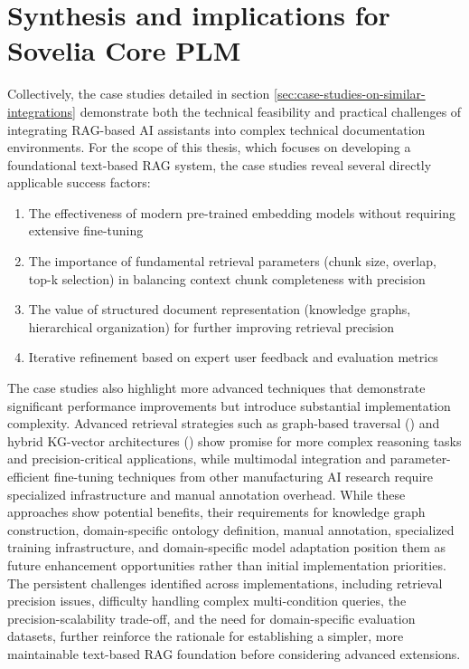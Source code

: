 \section{Synthesis and implications for Sovelia Core PLM}

Collectively, the case studies detailed in section \ref{sec:case-studies-on-similar-integrations} demonstrate both the technical feasibility and practical challenges of integrating RAG-based AI assistants into complex technical documentation environments. For the scope of this thesis, which focuses on developing a foundational text-based RAG system, the case studies reveal several directly applicable success factors:

\begin{enumerate}
    \item The effectiveness of modern pre-trained embedding models without requiring extensive fine-tuning
    \item The importance of fundamental retrieval parameters (chunk size, overlap, top-k selection) in balancing context chunk completeness with precision
    \item The value of structured document representation (knowledge graphs, hierarchical organization) for further improving retrieval precision
    \item Iterative refinement based on expert user feedback and evaluation metrics
\end{enumerate}

The case studies also highlight more advanced techniques that demonstrate significant performance improvements but introduce substantial implementation complexity. Advanced retrieval strategies such as graph-based traversal (\textcite{knollmeyer_document_2025}) and hybrid KG-vector architectures (\textcite{wang_artificial_2021}) show promise for more complex reasoning tasks and precision-critical applications, while multimodal integration and parameter-efficient fine-tuning techniques from other manufacturing AI research require specialized infrastructure and manual annotation overhead. While these approaches show potential benefits, their requirements for knowledge graph construction, domain-specific ontology definition, manual annotation, specialized training infrastructure, and domain-specific model adaptation position them as future enhancement opportunities rather than initial implementation priorities. The persistent challenges identified across implementations, including retrieval precision issues, difficulty handling complex multi-condition queries, the precision-scalability trade-off, and the need for domain-specific evaluation datasets, further reinforce the rationale for establishing a simpler, more maintainable text-based RAG foundation before considering advanced extensions.

